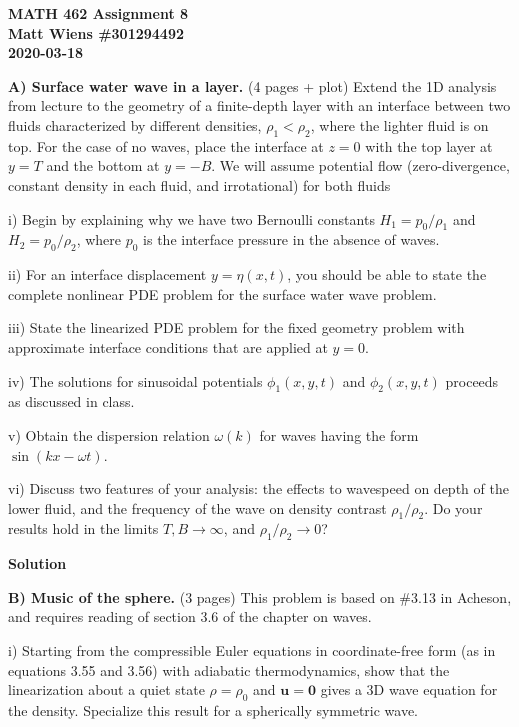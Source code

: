 \documentclass{article}
\def\*#1{\mathbf{#1}}
\begin{document}
\textbf{MATH 462 Assignment 8} \\
\textbf{Matt Wiens \#301294492} \\
\textbf{2020-03-18}

\textbf{A) Surface water wave in a layer.} (4 pages + plot)
Extend the 1D analysis from lecture to the geometry of a finite-depth
layer with an interface between two fluids characterized by different
densities, $\rho_1 < \rho_2$, where the lighter fluid is on top. For
the case of no waves, place the interface at $z = 0$ with the top layer
at $y = T$ and the bottom at $y = -B$. We will assume potential flow
(zero-divergence, constant density in each fluid, and irrotational) for
both fluids

i) Begin by explaining why we have two Bernoulli constants
$H_1 = p_0 / \rho_1$ and $H_2 = p_0 / \rho_2$, where $p_0$ is the
interface pressure in the absence of waves.

ii) For an interface displacement $y = \eta(x, t)$, you should be able
to state the complete nonlinear PDE problem for the surface water wave
problem.

iii) State the linearized PDE problem for the fixed geometry problem with
approximate interface conditions that are applied at $y = 0$.

iv) The solutions for sinusoidal potentials $\phi_1(x, y, t)$ and
$\phi_2(x, y, t)$ proceeds as discussed in class.

v) Obtain the dispersion relation $\omega(k)$ for waves having the form
$\sin(k x - \omega t)$.

vi) Discuss two features of your analysis: the effects to wavespeed on depth
of the lower fluid, and the frequency of the wave on density contrast
$\rho_1 / \rho_2$. Do your results hold in the limits $T, B \to \infty$,
and $\rho_1 / \rho_2 \to 0$?

\newpage

\textbf{Solution}

\newpage

\textbf{B) Music of the sphere.} (3 pages)
This problem is based on \#3.13 in Acheson, and requires reading of section 3.6
of the chapter on waves.

i) Starting from the compressible Euler equations in coordinate-free
form (as in equations 3.55 and 3.56) with adiabatic thermodynamics, show
that the linearization about a quiet state $\rho = \rho_0$ and $\*u =
\*0$ gives a 3D wave equation for the density. Specialize this result
for a spherically symmetric wave.
\end{document}
